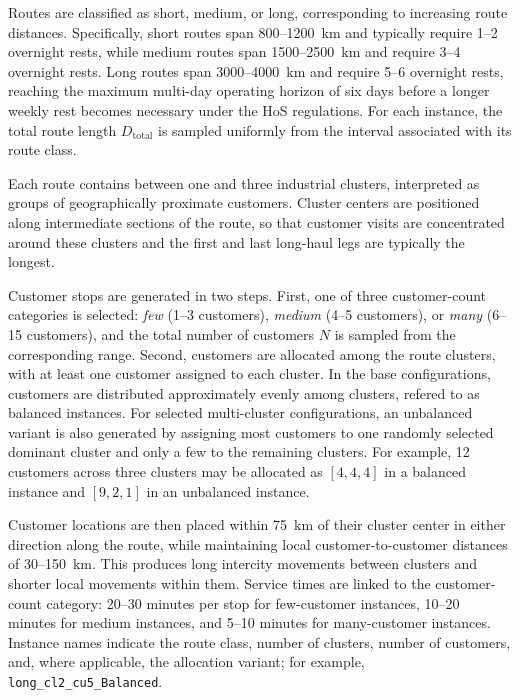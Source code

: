 \documentclass[3p,11pt,authoryear]{elsarticle}  %
\begin{document}
Routes are classified as {short}, {medium}, or {long}, corresponding to increasing route distances. Specifically, short routes span 800--1200~km and typically require 1--2 overnight rests, while medium routes span 1500--2500~km and require 3--4 overnight rests. Long routes span 3000--4000~km and require 5--6 overnight rests, reaching the maximum multi-day operating horizon of six days before a longer weekly rest becomes necessary under the HoS regulations. For each instance, the total route length \(D_{\text{total}}\) is sampled uniformly from the interval associated with its route class.

Each route contains between one and three industrial clusters, interpreted as groups of geographically proximate customers. Cluster centers are positioned along intermediate sections of the route, so that customer visits are concentrated around these clusters and the first and last long-haul legs are typically the longest. %


Customer stops are generated in two steps. First, one of three customer-count categories is selected: \textit{few} (1--3 customers), \textit{medium} (4--5 customers), or \textit{many} (6--15 customers), and the total number of customers \(N\) is sampled from the corresponding range. Second, customers are allocated among the route clusters, with at least one customer assigned to each cluster. In the base configurations, customers are distributed approximately evenly among clusters, refered to as balanced instances. For selected multi-cluster configurations, an unbalanced variant is also generated by assigning most customers to one randomly selected dominant cluster and only a few to the remaining clusters. For example, 12 customers across three clusters may be allocated as \([4,4,4]\) in a balanced instance and \([9,2,1]\) in an unbalanced instance. %

Customer locations are then placed within 75~km of their cluster center in either direction along the route, while maintaining local customer-to-customer distances of 30--150~km. This produces long intercity movements between clusters and shorter local movements within them. Service times are linked to the customer-count category: 20--30 minutes per stop for few-customer instances, 10--20 minutes for medium instances, and 5--10 minutes for many-customer instances. Instance names indicate the route class, number of clusters, number of customers, and, where applicable, the allocation variant; for example, \texttt{long\_cl2\_cu5\_Balanced}.
\end{document}
